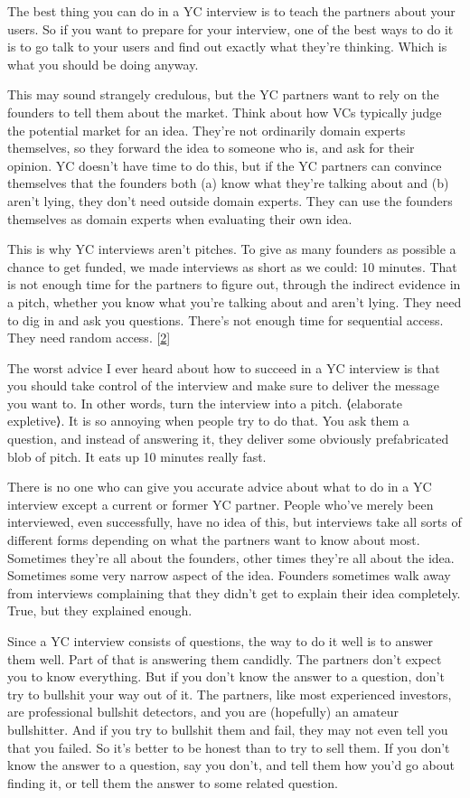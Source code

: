 The best thing you can do in a YC interview is to teach the partners
about your users. So if you want to prepare for your interview, one of
the best ways to do it is to go talk to your users and find out exactly
what they're thinking. Which is what you should be doing anyway.

This may sound strangely credulous, but the YC partners want to rely on
the founders to tell them about the market. Think about how VCs
typically judge the potential market for an idea. They're not ordinarily
domain experts themselves, so they forward the idea to someone who is,
and ask for their opinion. YC doesn't have time to do this, but if the
YC partners can convince themselves that the founders both (a) know what
they're talking about and (b) aren't lying, they don't need outside
domain experts. They can use the founders themselves as domain experts
when evaluating their own idea.

This is why YC interviews aren't pitches. To give as many founders as
possible a chance to get funded, we made interviews as short as we
could: 10 minutes. That is not enough time for the partners to figure
out, through the indirect evidence in a pitch, whether you know what
you're talking about and aren't lying. They need to dig in and ask you
questions. There's not enough time for sequential access. They need
random access. {[}\hyperref[f2n]{2}{]}

The worst advice I ever heard about how to succeed in a YC interview is
that you should take control of the interview and make sure to deliver
the message you want to. In other words, turn the interview into a
pitch. ⟨elaborate expletive⟩. It is so annoying when people try to do
that. You ask them a question, and instead of answering it, they deliver
some obviously prefabricated blob of pitch. It eats up 10 minutes really
fast.

There is no one who can give you accurate advice about what to do in a
YC interview except a current or former YC partner. People who've merely
been interviewed, even successfully, have no idea of this, but
interviews take all sorts of different forms depending on what the
partners want to know about most. Sometimes they're all about the
founders, other times they're all about the idea. Sometimes some very
narrow aspect of the idea. Founders sometimes walk away from interviews
complaining that they didn't get to explain their idea completely. True,
but they explained enough.

Since a YC interview consists of questions, the way to do it well is to
answer them well. Part of that is answering them candidly. The partners
don't expect you to know everything. But if you don't know the answer to
a question, don't try to bullshit your way out of it. The partners, like
most experienced investors, are professional bullshit detectors, and you
are (hopefully) an amateur bullshitter. And if you try to bullshit them
and fail, they may not even tell you that you failed. So it's better to
be honest than to try to sell them. If you don't know the answer to a
question, say you don't, and tell them how you'd go about finding it, or
tell them the answer to some related question.

